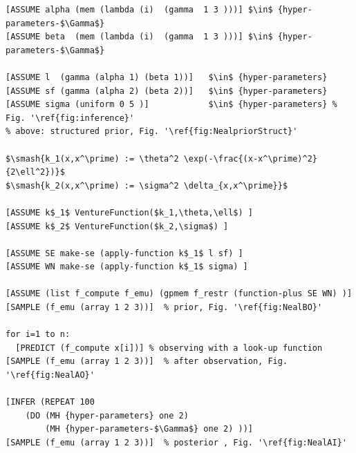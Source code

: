\documentclass{article} %
\begin{document}
\begin{minipage}{\linewidth}
\footnotesize
\belowcaptionskip=-10pt
\begin{lstlisting}[frame=single,caption=Hierarchical  GP Smoothing,mathescape,label=alg:gphierarch,escapechar=']
[ASSUME alpha (mem (lambda (i)  (gamma  1 3 )))] $\in$ {hyper-parameters-$\Gamma$} 
[ASSUME beta  (mem (lambda (i)  (gamma  1 3 )))] $\in$ {hyper-parameters-$\Gamma$} 

[ASSUME l  (gamma (alpha 1) (beta 1))]   $\in$ {hyper-parameters} 
[ASSUME sf (gamma (alpha 2) (beta 2))]   $\in$ {hyper-parameters}
[ASSUME sigma (uniform 0 5 )]            $\in$ {hyper-parameters} % Fig. '\ref{fig:inference}'
% above: structured prior, Fig. '\ref{fig:NealpriorStruct}'

$\smash{k_1(x,x^\prime) := \theta^2 \exp(-\frac{(x-x^\prime)^2}{2\ell^2})}$
$\smash{k_2(x,x^\prime) := \sigma^2 \delta_{x,x^\prime}}$

[ASSUME k$_1$ VentureFunction($k_1,\theta,\ell$) ]
[ASSUME k$_2$ VentureFunction($k_2,\sigma$) ]

[ASSUME SE make-se (apply-function k$_1$ l sf) ]
[ASSUME WN make-se (apply-function k$_1$ sigma) ]

[ASSUME (list f_compute f_emu) (gpmem f_restr (function-plus SE WN) )]
[SAMPLE (f_emu (array 1 2 3))]  % prior, Fig. '\ref{fig:NealBO}'

for i=1 to n:
  [PREDICT (f_compute x[i])] % observing with a look-up function
[SAMPLE (f_emu (array 1 2 3))]  % after observation, Fig. '\ref{fig:NealAO}'
  
[INFER (REPEAT 100 
	(DO (MH {hyper-parameters} one 2)
	    (MH {hyper-parameters-$\Gamma$} one 2) ))]
[SAMPLE (f_emu (array 1 2 3))]  % posterior , Fig. '\ref{fig:NealAI}'
\end{lstlisting}
\end{minipage}
\end{document}
